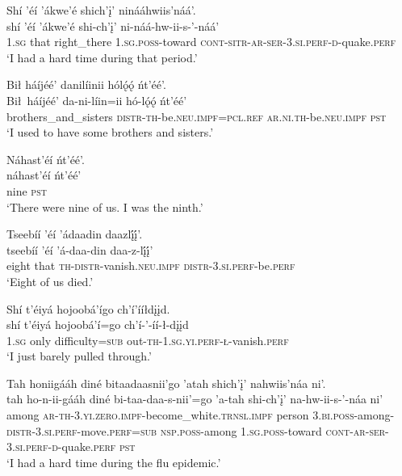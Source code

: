 \ea\label{ex:text6-16-6}
Shí ’éí ’ákwe’é shich’į’ ninááhwiis’náá’.\\
\gll shí	’éí	’ákwe’é	shi-ch’į’	ni-náá-hw-ii-s-’-náá’\\
     1.\textsc{sg}	that	right\_there	1.\textsc{sg}.\textsc{poss}-toward	\textsc{cont}-\textsc{sitr}-\textsc{ar}-\textsc{ser}-3.\textsc{si}.\textsc{perf}-\textsc{d}-quake.\textsc{perf}\\
\glt `I had a hard time during that period.'
\z

\ea\label{ex:text6-16-7}
Bił háíjéé’ danilíinii hólǫ́ǫ́ ńt’éé’.\\
\gll Bił~{háíjéé’}	da-ni-líin=ii	hó-lǫ́ǫ́	ńt’éé’\\
     brothers\_and\_sisters	\textsc{distr}-\textsc{th}-be.\textsc{neu}.\textsc{impf}=\textsc{pcl}.\textsc{ref}	\textsc{ar}.\textsc{ni}.\textsc{th}-be.\textsc{neu}.\textsc{impf}	\textsc{pst}\\
\glt `I used to have some brothers and sisters.'
\z

\ea\label{ex:text6-16-8}
Náhast’éí ńt’éé’.\\
\gll náhast’éí	ńt’éé’\\
     nine	\textsc{pst}\\
\glt `There were nine of us.  I was the ninth.'
\z

\ea\label{ex:text6-16-9}
Tseebíí ’éí ’ádaadin daazlį́į́’.\\
\gll tseebíí	’éí	’á-daa-din	daa-z-lį́į́’\\
     eight	that	\textsc{th}-\textsc{distr}-vanish.\textsc{neu}.\textsc{impf}	\textsc{distr}-3.\textsc{si}.\textsc{perf}-be.\textsc{perf}\\
\glt `Eight of us died.'
\z

\ea\label{ex:text6-16-10}
Shí t’éiyá hojoobá’ígo ch’í’ííłdįįd.\\
\gll shí	t’éiyá	hojoobá’í=go	ch’í-’-íí-ł-dįįd\\
     1.\textsc{sg}	only	difficulty=\textsc{sub}	out-\textsc{th}-1.\textsc{sg}.\textsc{yi}.\textsc{perf}-\textsc{ł}-vanish.\textsc{perf}\\
\glt `I just barely pulled through.'
\z

\ea\label{ex:text6-16-11}
Tah honiigááh diné bitaadaasnii’go ’atah shich’į’ nahwiis’náa ni’.\\
\gll tah ho-n-ii-gááh	diné	bi-taa-daa-s-nii’=go	’a-tah	shi-ch’į’	na-hw-ii-s-’-náa	ni’\\
     among \textsc{ar}-\textsc{th}-3.\textsc{yi}.\textsc{zero}.\textsc{impf}-become\_white.\textsc{trnsl}.\textsc{impf}	person	3.\textsc{bi}.\textsc{poss}-among-\textsc{distr}-3.\textsc{si}.\textsc{perf}-move.\textsc{perf}=\textsc{sub}	\textsc{nsp}.\textsc{poss}-among	1.\textsc{sg}.\textsc{poss}-toward	\textsc{cont}-\textsc{ar}-\textsc{ser}-3.\textsc{si}.\textsc{perf}-\textsc{d}-quake.\textsc{perf}	\textsc{pst}\\
\glt `I had a hard time during the flu epidemic.'
\z

